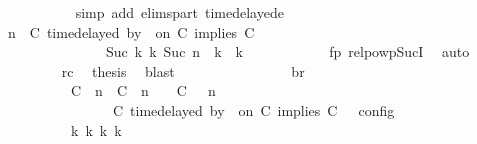 \begin{isabellebody}
\ \ \ \ \ \ \ \ \ \ \isamarkupfalse%
\ {\isacharparenleft}simp\ add{\isacharcolon}\ elims{\isacharunderscore}part\ timedelayed{\isacharunderscore}e{}{\isacharparenright}\isanewline
\ \ \ \ \ \ \ \ \isamarkupfalse%
\ {\isacartoucheopen}{\isacharparenleft}{\isasymGamma}{\isacharcomma}\ n\ {\isasymturnstile}\ {\isacharparenleft}{\isacharparenleft}C\ time{\isacharminus}delayed\ by\ {\isasymdelta}{\isasymtau}\ on\ C\ implies\ C\ {\isacharhash}\ {\isasymPsi}{\isacharparenright}\ {\isasymtriangleright}\ {\isasymPhi}{\isacharparenright}\isanewline
\ \ \ \ \ \ \ \ \ \ \ \ \ \ \ \ {\isasymhookrightarrow}\isactrlbsup Suc\ k\isactrlesup \ {\isacharparenleft}{\isasymGamma}\isactrlsub k{\isacharcomma}\ Suc\ n\ {\isasymturnstile}\ {\isasymPsi}\isactrlsub k\ {\isasymtriangleright}\ {\isasymPhi}\isactrlsub k{\isacharparenright}{\isacartoucheclose}\isanewline
\ \ \ \ \ \ \ \ \ \ \isamarkupfalse%
\ fp\ relpowp{\isacharunderscore}Suc{\isacharunderscore}I{}\ \isamarkupfalse%
\ auto\isanewline
\ \ \ \ \ \ \ \ \isamarkupfalse%
\ rc\ \isamarkupfalse%
\ {\isacharquery}thesis\ \isamarkupfalse%
\ blast\isanewline
\ \ \ \ \ \ \isamarkupfalse%
\isanewline
\ \ \ \ \ \ \isamarkupfalse%
\ \isamarkupfalse%
\ br{}{\isacharcolon}\isanewline
\ \ \ \ \ \ \ \ {\isacartoucheopen}{\isasymrho}\ {\isasymin}\ {\isasymlbrakk}\ {\isacharparenleft}{\isacharparenleft}C\ {\isasymUp}\ n{\isacharparenright}\ {\isacharhash}\ {\isacharparenleft}C\ {\isacharat}\ n\ {\isasymoplus}\ {\isasymdelta}{\isasymtau}\ {\isasymRightarrow}\ C\ {\isacharhash}\ {\isasymGamma}{\isacharparenright}{\isacharcomma}\ n\isanewline
\ \ \ \ \ \ \ \ \ \ \ \ \ \ {\isasymturnstile}\ {\isasymPsi}\ {\isasymtriangleright}\ {\isacharparenleft}{\isacharparenleft}C\ time{\isacharminus}delayed\ by\ {\isasymdelta}{\isasymtau}\ on\ C\ implies\ C\ {\isacharhash}\ {\isasymPhi}{\isacharparenright}\ {\isasymrbrakk}\isactrlsub c\isactrlsub o\isactrlsub n\isactrlsub f\isactrlsub i\isactrlsub g\isanewline
\ \ \ \ \ \ \ \ \ \ {\isasymLongrightarrow}\ {\isasymexists}{\isasymGamma}\isactrlsub k\ {\isasymPsi}\isactrlsub k\ {\isasymPhi}\isactrlsub k\ k{\isachardot}\isanewline

\end{isabellebody}
